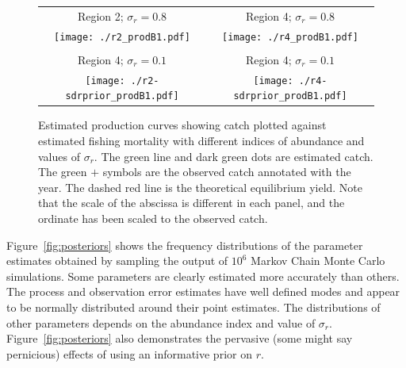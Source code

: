 \documentclass[12pt,letterpaper]{article}
\begin{document}
\begin{figure}
\begin{center}
{\scriptsize \sffamily
\begin{tabular}{cc}
Region 2; $\sigma_r = 0.8$ & Region 4; $\sigma_r = 0.8$ \\
\texttt{[image: ./r2\_prodB1.pdf]} &
\texttt{[image: ./r4\_prodB1.pdf]} \\
\\
Region 4; $\sigma_r = 0.1$ & Region 4; $\sigma_r = 0.1$ \\
\texttt{[image: ./r2-sdrprior\_prodB1.pdf]} &
\texttt{[image: ./r4-sdrprior\_prodB1.pdf]} \\
\end{tabular}
}
\caption{Estimated production curves showing catch plotted against
estimated fishing mortality with different indices of abundance
and values of $\sigma_r$.
The green line and dark green dots are estimated catch.
The green $+$ symbols are the observed catch annotated with the year.
The dashed red line is the theoretical equilibrium yield.
Note that the scale of the abscissa is different in each panel, and
the ordinate has been scaled to the observed catch.
\label{fig:estprod}}
\end{center}
\end{figure}


Figure~\ref{fig:posteriors} shows the frequency distributions of the
parameter estimates obtained by sampling the output of $10^6$ Markov
Chain Monte Carlo simulations. Some parameters are clearly estimated
more accurately than others. The process and observation error
estimates have well defined modes and appear to be normally
distributed around their point estimates. The distributions of other
parameters depends on the abundance index and value of $\sigma_r$.
Figure~\ref{fig:posteriors} also demonstrates the pervasive (some
might say pernicious) effects of using an informative prior on $r$.
\end{document}
